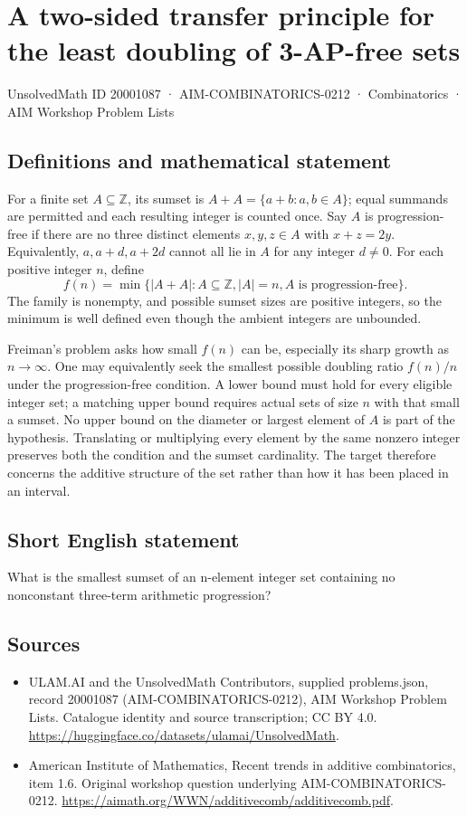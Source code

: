 \documentclass[11pt,a4paper]{article}
\begin{document}
\section*{A two-sided transfer principle for the least doubling of 3-AP-free sets}\label{20001087}
{\small UnsolvedMath ID 20001087 · AIM-COMBINATORICS-0212 · Combinatorics · AIM Workshop Problem Lists}
\subsection{Definitions and mathematical statement}
For a finite set $A\subseteq\mathbb Z$, its sumset is
$A+A=\{a+b:a,b\in A\}$; equal summands are permitted and each
resulting integer is counted once. Say $A$ is progression-free if
there are no three distinct elements $x,y,z\in A$ with $x+z=2y$.
Equivalently, $a,a+d,a+2d$ cannot all lie in $A$ for any integer
$d\ne0$. For each positive integer $n$, define
\[
 f(n)=\min\{|A+A|:A\subseteq\mathbb Z, |A|=n,
                                   A\text{ is progression-free}\}.
\]
The family is nonempty, and possible sumset sizes are positive
integers, so the minimum is well defined even though the ambient
integers are unbounded.

Freiman's problem asks how small $f(n)$ can be, especially its sharp
growth as $n\to\infty$. One may equivalently seek the smallest
possible doubling ratio $f(n)/n$ under the progression-free condition.
A lower bound must hold for every eligible integer set; a matching
upper bound requires actual sets of size $n$ with that small a sumset.
No upper bound on the diameter or largest element of $A$ is part
of the hypothesis. Translating or multiplying every element by the
same nonzero integer preserves both the condition and the sumset
cardinality. The target therefore concerns the additive structure of
the set rather than how it has been placed in an interval.
\subsection{Short English statement}
What is the smallest sumset of an n-element integer set containing no nonconstant three-term arithmetic progression?
\subsection{Sources}
\begin{itemize}
\item[S1] ULAM.AI and the UnsolvedMath Contributors, supplied problems.json, record 20001087 (AIM-COMBINATORICS-0212), AIM Workshop Problem Lists. Catalogue identity and source transcription; CC BY 4.0.
\url{https://huggingface.co/datasets/ulamai/UnsolvedMath}.
\item[S2] American Institute of Mathematics, Recent trends in additive combinatorics, item 1.6. Original workshop question underlying AIM-COMBINATORICS-0212.
\url{https://aimath.org/WWN/additivecomb/additivecomb.pdf}.
\end{itemize}
\end{document}
